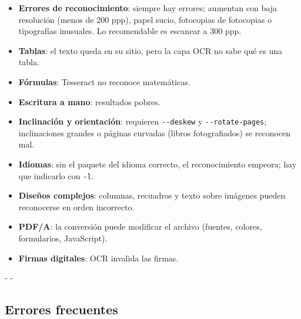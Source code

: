 \documentclass[11pt,a4paper]{article}
\makeatletter
\newcommand{\necesitaespacio}[1]{\par\penalty-100\begingroup
	\setlength{\dimen@}{#1}\dimen@ii\pagegoal\advance\dimen@ii-\pagetotal
	\ifdim\dimen@>\dimen@ii\ifdim\dimen@ii>\z@\vfil\fi\penalty-\@M\fi\endgroup}
\newcommand{\opt}[1]{\texttt{\textcolor{colopt}{#1}}}      %
\makeatother
\begin{document}
	\begin{limitacion}
		\begin{itemize}
			\item \textbf{Errores de reconocimiento}: siempre hay errores; aumentan con baja resolución (menos de 200 ppp), papel sucio, fotocopias de fotocopias o tipografías inusuales. Lo recomendable es escanear a 300 ppp.
			\item \textbf{Tablas}: el texto queda en su sitio, pero la capa OCR no sabe qué es una tabla.
			\item \textbf{Fórmulas}: Tesseract no reconoce matemáticas.
			\item \textbf{Escritura a mano}: resultados pobres.
			\item \textbf{Inclinación y orientación}: requieren \opt{-{}-deskew} y \opt{-{}-rotate-pages}; inclinaciones grandes o páginas curvadas (libros fotografiados) se reconocen mal.
			\item \textbf{Idiomas}: sin el paquete del idioma correcto, el reconocimiento empeora; hay que indicarlo con \opt{-l}.
			\item \textbf{Diseños complejos}: columnas, recuadros y texto sobre imágenes pueden reconocerse en orden incorrecto.
			\item \textbf{PDF/A}: la conversión puede modificar el archivo (fuentes, colores, formularios, JavaScript).
			\item \textbf{Firmas digitales}: OCR invalida las firmas.
		\end{itemize}
	\end{limitacion}
	
	\necesitaespacio{14\baselineskip}
	\subsection{Errores frecuentes}
	
\end{document}
